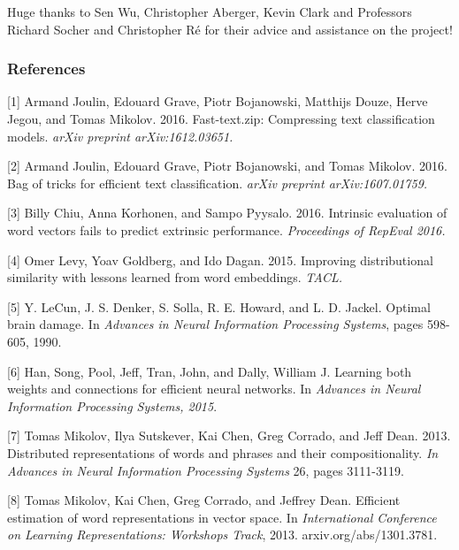 \documentclass{article} %
\begin{document}
Huge thanks to Sen Wu, Christopher Aberger, Kevin Clark and Professors
Richard Socher and Christopher R\'e for their advice and assistance on
the project!

\subsubsection*{References}

\small{ [1] Armand Joulin, Edouard Grave, Piotr Bojanowski, Matthijs
  Douze, Herve Jegou, and Tomas Mikolov. 2016. Fast-text.zip:
  Compressing text classification models. {\it arXiv preprint
  arXiv:1612.03651.}}

\small{[2] Armand Joulin, Edouard Grave, Piotr Bojanowski, and
  Tomas Mikolov. 2016. Bag of tricks for efficient text
  classification. {\it arXiv preprint arXiv:1607.01759.}
}

\small{[3] Billy Chiu, Anna Korhonen, and Sampo Pyysalo.
  2016. Intrinsic evaluation of word vectors fails
  to predict extrinsic performance. {\it Proceedings of RepEval 2016.}
}

\small{[4] Omer Levy, Yoav Goldberg, and Ido Dagan. 2015. Improving
  distributional similarity with lessons learned from word
  embeddings. {\it TACL.}
}

\small{[5] Y. LeCun, J. S. Denker, S. Solla, R. E. Howard, and
  L. D. Jackel. Optimal brain damage. In {\it Advances in Neural
    Information Processing Systems}, pages 598-605, 1990.
}

\small{[6] Han, Song, Pool, Jeff, Tran, John, and Dally, William
  J. Learning both weights and connections for efficient neural
  networks. In {\it Advances in Neural Information Processing Systems,
  2015}.
}

\small{[7] Tomas Mikolov, Ilya Sutskever, Kai Chen, Greg Corrado, and
  Jeff Dean. 2013. Distributed representations of words and phrases
  and their compositionality. {\it In Advances in Neural Information
  Processing Systems} 26, pages 3111-3119.}

\small{[8] Tomas Mikolov, Kai Chen, Greg Corrado, and Jeffrey
  Dean. Efficient estimation of word representations in vector
  space. In {\it International Conference on Learning Representations:
    Workshops Track}, 2013.  arxiv.org/abs/1301.3781.}
\end{document}

